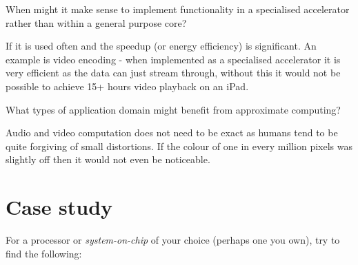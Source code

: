 \documentclass{supervision}
\begin{document}
\begin{questions}
\begin{parts}
    \end{parts}
    \question
    When might it make sense to implement functionality in a specialised accelerator rather than within a general purpose core?
    \begin{solution}
    If it is used often and the speedup (or energy efficiency) is significant. An example is video encoding - when implemented as a specialised accelerator it is very efficient as the data can just stream through, without this it would not be possible to achieve 15+ hours video playback on an iPad.
    \end{solution}

    \question
    What types of application domain might benefit from approximate computing?
    \begin{solution}
    Audio and video computation does not need to be exact as humans tend to be quite forgiving of small distortions. If the colour of one in every million pixels was slightly off then it would not even be noticeable.
    \end{solution}


\end{questions}

\section*{Case study}

For a processor or \textit{system-on-chip} of your choice (perhaps one you own), try to find the following:
\end{document}
